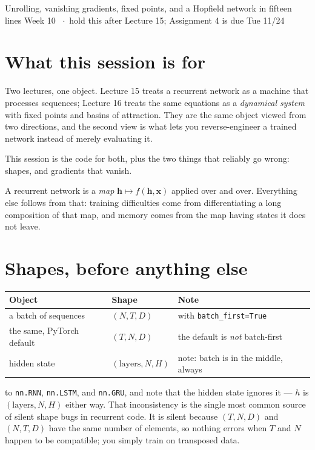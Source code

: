 \documentclass[11pt]{article}
\begin{document}
  {Unrolling, vanishing gradients, fixed points, and a Hopfield network in fifteen lines}
  {Week 10 \ $\cdot$\ hold this after Lecture 15; Assignment 4 is due Tue 11/24}

\section*{What this session is for}

Two lectures, one object. Lecture 15 treats a recurrent network as a machine
that processes sequences; Lecture 16 treats the same equations as a
\emph{dynamical system} with fixed points and basins of attraction. They are the
same object viewed from two directions, and the second view is what lets you
reverse-engineer a trained network instead of merely evaluating it.

This session is the code for both, plus the two things that reliably go wrong:
shapes, and gradients that vanish.

\begin{keybox}
 A recurrent network is a \emph{map} $\boldsymbol{h} \mapsto
f(\boldsymbol{h}, \boldsymbol{x})$ applied over and over. Everything else
follows from that: training difficulties come from differentiating a long
composition of that map, and memory comes from the map having states it does not
leave.
\end{keybox}

\section{Shapes, before anything else}

\begin{center}
\begin{tabular}{@{}lll@{}}
\toprule
Object & Shape & Note \\
\midrule
a batch of sequences & $(N, T, D)$ & with \texttt{batch\_first=True} \\
the same, PyTorch default & $(T, N, D)$ & the default is \emph{not} batch-first \\
hidden state & $(\text{layers}, N, H)$ & note: batch is in the middle, always \\
\bottomrule
\end{tabular}
\end{center}

\begin{keybox}
 to \texttt{nn.RNN},
\texttt{nn.LSTM}, and \texttt{nn.GRU}, and note that the hidden state ignores it
--- $h$ is $(\text{layers}, N, H)$ either way. That inconsistency is the single
most common source of silent shape bugs in recurrent code. It is silent because
$(T, N, D)$ and $(N, T, D)$ have the same number of elements, so nothing errors
when $T$ and $N$ happen to be compatible; you simply train on transposed data.
\end{keybox}
\end{document}
